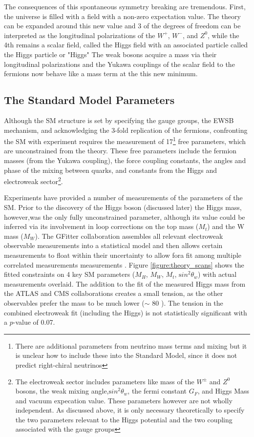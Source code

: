 The consequences of this spontaneous symmetry breaking are tremendous. First,
the universe is filled with a field with a non-zero expectation value.
The theory can be expanded around this new value and 3 of the
degrees of freedom can be interpreted as the longitudinal polarizations of
the $W^+$, $W^-$, and $Z^0$, while the 4th remains a scalar field, called
the Higgs field with an associated particle called the Higgs particle or "Higgs"
The weak bosons acquire a mass via their longitudinal polarizations and the Yukawa
couplings of the scalar field to the fermions now behave like a mass term
at the this new minimum. 


\subsection{The Standard Model Parameters}

Although the SM structure is set by specifying the gauge groups, the EWSB
mechanism, and acknowledging the 3-fold replication of the fermions,
confronting the SM with experiment requires the measurement of
17\footnote{There are additional parameters from neutrino mass terms and
mixing but it is unclear how to include these into the Standard Model,
since it does not predict right-chiral neutrinos} free parameters, which
are unconstrained from the theory. These free parameters include the fermion
masses (from the Yukawa coupling), the force coupling constants, the angles and phase of the mixing between
quarks, and constants from the
Higgs and electroweak sector\footnote{ The electroweak sector includes
parameters like mass of the $W^{\pm}$ and $Z^0$ bosons, the weak mixing
angle,${\mathrm sin^2}\theta_w$, the fermi constant $G_F$, and Higgs
Mass and vacuum expecation value. These parameters however are not
wholly independent. As discussed above, it is only necessary
theoretically to specify the two parameters relevant to the Higgs
potential and the two coupling associated with the gauge groups }.

Experiments have provided a number of measurements of the
parameters of the SM\cite{lepew:2010vi}.  Prior to the discovery of the Higgs boson (discussed later) the Higgs mass,
however,was the only fully unconstrained parameter, although its value could be inferred 
via its involvement in loop corrections on the top mass
($M_t$) and the W mass ($M_W$). The GFitter collaboration assembles
all relevant electroweak observable measurements into a statistical
model and then allows certain measurements to float within their
uncertainty to allow fora fit among multiple correlated measurements
measurements \cite{GFitter}. Figure \ref{figure:theory_scans} shows the fitted constraints on 4 key SM
parameters ($M_H$, $M_W$, $M_t$, ${\mathrm sin^2}\theta_w$) with
actual measurements overlaid. The addition to the fit of the measured
Higgs mass from the ATLAS and CMS collaborations creates a small
tension, as the other observables prefer the mass to be much
lower ($\sim$ 80 \gevcc). The tension in the combined
electroweak fit (including the Higgs) is not statistically
significant with a $p$-value of 0.07.  


